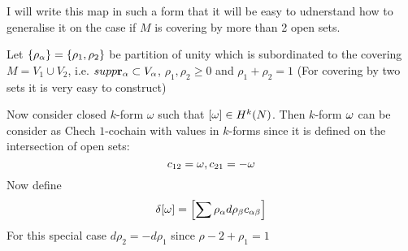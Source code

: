 I will write this map in such a form that it will be easy to udnerstand how to generalise it on the case
if $M$ is covering by more than 2 open sets.

Let $\{\rho_\alpha\}=\{\rho_1,\rho_2\}$ be partition of unity which is subordinated to the covering $M=V_1\cup V_2$, i.e.
  $supp {\bf r}_\alpha \subset V_\alpha$, $\rho_1,\rho_2\geq 0$ and $\rho_1+\rho_2=1$ 
  (For covering by two sets it is very easy to construct)
  
  
  Now consider closed $k$-form $\omega$ such that $[\omega]\in H^k(N)$. Then
  $k$-form $\omega$ can be consider as Chech $1$-cochain with values in $k$-forms since it is defined
  on the intersection of open sets:
              $$
           c_{12}=\omega, c_{21}=-\omega   
              $$ 
  Now define
           $$
          \delta [\omega]=\left[\sum \rho_\alpha d\rho_\beta c_{\alpha\beta}\right] 
           $$
For this special case $d\rho_2=-d\rho_1$ since $\rho-2+\rho_1=1$                     
                     
\bye
